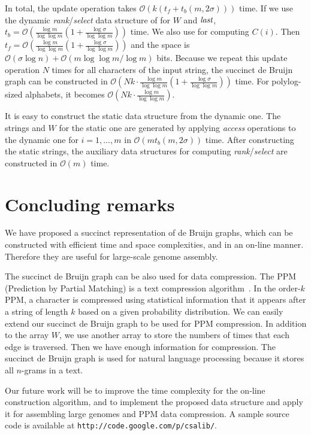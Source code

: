 \documentclass{llncs}
\newcommand{\Order}{\mathcal{O}}
\def\rank{\textit{rank}}
\def\select{\textit{select}}
\def\access{\textit{access}}
\begin{document}
In total, the update operation takes 
$\Order(k(t_f + t_b(m,2\sigma)))$ time.
If we use the dynamic {\rank}/{\select} data structure of \cite{NavSad10}
for $W$ and ${\textit{last}}$, $t_b = \Order(\frac{\log m}{\log \log m}(1+\frac{\log\sigma}{\log\log m}))$ time.
We also use \cite{NavSad10} for computing $C(i)$.  Then $t_f = \Order(\frac{\log m }{\log \log m}(1+\frac{\log\sigma}{\log\log m}))$
and the space is $\Order(\sigma \log n) + \Order(m \log \log m/\log m)$ bits.
Because we repeat this update operation $N$ times for all characters of the input string,
the succinct de Bruijn graph can be constructed in
$\Order\left(Nk \cdot \frac{\log m}{\log \log m}
(1+\frac{\log\sigma}{\log\log m})\right)$ time.
For polylog-sized alphabets, it becomes $\Order(Nk \cdot \frac{\log m}{\log \log m})$.

It is easy to construct the static data structure from the dynamic one.
The strings {\last} and $W$ for the static one are generated by
applying {\access} operations to the dynamic one for $i=1,\ldots,m$
in $\Order(m t_b(m,2\sigma))$ time.
After constructing the static strings, the auxiliary data structures for
computing {\rank}/{\select} are constructed in $\Order(m)$ time.


\section{Concluding remarks}\label{sec:conclusion}
We have proposed a succinct representation of de Bruijn graphs,
which can be constructed with efficient time and space complexities,
and in an on-line manner.
Therefore they are useful for large-scale genome assembly.

The succinct de Bruijn graph can be also used for data compression.
The PPM (Prediction by Partial Matching) is a text compression algorithm~\cite{CleWit84}.
In the order-$k$ PPM, a character is compressed using statistical information
that it appears after a string of length $k$ based on a given probability distribution.
We can easily extend our succinct de Bruijn graph to be used for PPM compression.
In addition to the array $W$, we use another array to store the numbers of times
that each edge is traversed.  Then we have enough information for compression.
The succinct de Bruijn graph is used for natural language processing because
it stores all $n$-grams in a text.

Our future work will be to improve the time complexity for the on-line construction
algorithm, and to implement the proposed data structure and apply it
for assembling large genomes and PPM data compression.
A sample source code is available at {\tt http://code.google.com/p/csalib/}.
\end{document}
